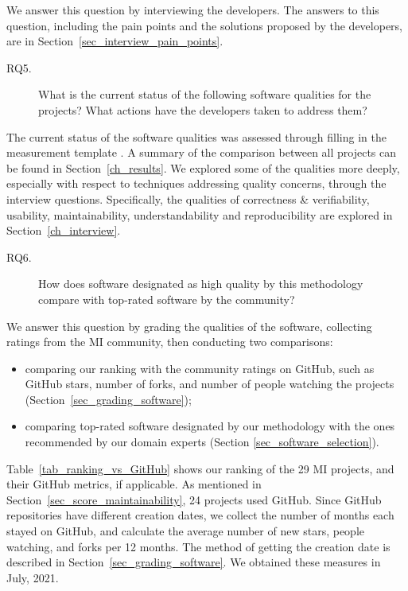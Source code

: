 \documentclass[final, 3p, times, authoryear]{elsarticle}
\begin{document}
We answer this question by interviewing the developers. The answers to this
question, including the pain points and the solutions proposed by the
developers, are in Section~\ref{sec_interview_pain_points}.

\begin{description}
\item[RQ5.] What is the current status of the following
software qualities for the projects? What actions have the developers taken to
address them?
\end{description}

The current status of the software qualities was assessed through filling in the
measurement template \citep{Dong2021-Data}.  A summary of the comparison between
all projects can be found in Section~\ref{ch_results}.  We explored some of the
qualities more deeply, especially with respect to techniques addressing quality
concerns, through the interview questions.  Specifically, the qualities of
correctness \& verifiability, usability, maintainability, understandability and
reproducibility are explored in Section~\ref{ch_interview}.

\begin{description}
\item[RQ6.] How does software designated as high quality by this methodology
compare with top-rated software by the community?
\end{description}

We answer this question by grading the qualities of the software, collecting
ratings from the MI community, then conducting two comparisons:
\begin{itemize}
\item comparing our ranking with the community ratings on GitHub, such as GitHub
stars, number of forks, and number of people watching the projects (Section~\ref{sec_grading_software});
\item comparing top-rated software designated by our methodology with the ones
recommended by our domain experts (Section \ref{sec_software_selection}).
\end{itemize}

Table~\ref{tab_ranking_vs_GitHub} shows our ranking of the 29 MI projects, and
their GitHub metrics, if applicable. As mentioned in
Section~\ref{sec_score_maintainability}, 24 projects used GitHub. Since GitHub
repositories have different creation dates, we collect the number of months each
stayed on GitHub, and calculate the average number of new stars, people
watching, and forks per 12 months. The method of getting the creation date is
described in Section~\ref{sec_grading_software}.  We obtained these
measures in July, 2021.
\end{document}
